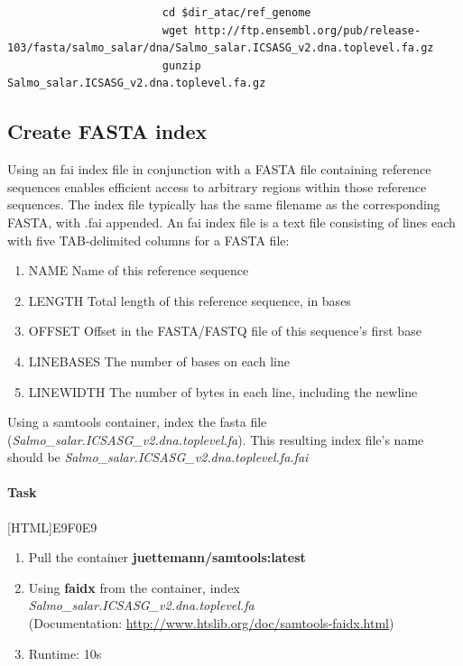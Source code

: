 \documentclass[12pt]{article}
\begin{document}
				\begin{minipage}{\linewidth}
					\begin{lstlisting}
						cd $dir_atac/ref_genome  
						wget http://ftp.ensembl.org/pub/release-103/fasta/salmo_salar/dna/Salmo_salar.ICSASG_v2.dna.toplevel.fa.gz
						gunzip Salmo_salar.ICSASG_v2.dna.toplevel.fa.gz
					\end{lstlisting}
				\end{minipage}
		
		
		\subsection{Create FASTA index}
			Using an fai index file in conjunction with a FASTA  file containing reference sequences enables efficient access to arbitrary regions within those reference sequences. 
			The index file typically has the same filename as the corresponding FASTA, with .fai appended.
			An fai index file is a text file consisting of lines each with five TAB-delimited columns for a FASTA file:
			\begin{enumerate}
				\item NAME	Name of this reference sequence
				\item LENGTH	Total length of this reference sequence, in bases
				\item OFFSET	Offset in the FASTA/FASTQ file of this sequence's first base
				\item LINEBASES	The number of bases on each line
				\item LINEWIDTH	The number of bytes in each line, including the newline
			\end{enumerate}
		
			Using a samtools container, index the fasta file (\textit{Salmo\_salar.ICSASG\_v2.dna.toplevel.fa}). 
			This resulting index file's name should be \textit{Salmo\_salar.ICSASG\_v2.dna.toplevel.fa.fai}
		
			\paragraph{Task}
				[HTML]{E9F0E9}{\parbox{\linewidth}{%
						\begin{enumerate}
							\item Pull the container\textbf{ juettemann/samtools:latest} 
							\item Using  \textbf{faidx} from the container, index \textit{Salmo\_salar.ICSASG\_v2.dna.toplevel.fa}\\
							(Documentation: \url{http://www.htslib.org/doc/samtools-faidx.html})
							\item Runtime: 10s
						\end{enumerate}
				}}
		
\end{document}
